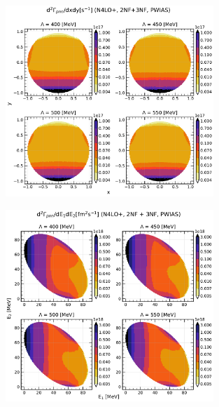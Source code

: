     \begin{figure}[h]
        \begin{center}
        \includegraphics[width=0.7\textwidth]{PlotData/PION/Dalitz_maps/figures/Dalitz_map_pnn_xy_cutofs_PWIAS.pdf}
        \end{center}
        \caption{}
        \label{pion_map_xy_cutoff_PW}
    \end{figure}

    \begin{figure}[h]
        \begin{center}
        \includegraphics[width=0.7\textwidth]{PlotData/PION/Dalitz_maps/figures/Dalitz_map_pnn_E1E2_cutofs_PWIAS.pdf}
        \end{center}
        \caption{}
        \label{pion_map_E1E2_cutoff_PW}
    \end{figure}


